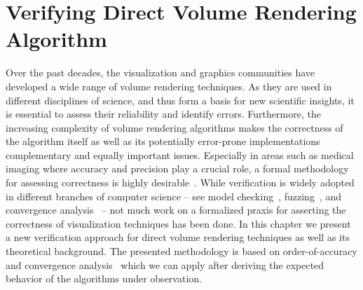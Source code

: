 \chapter{Verifying Direct Volume Rendering Algorithm}
\label{chap:vr}

Over the past decades, the visualization and graphics communities have developed a wide range of volume rendering techniques. As they are used in different disciplines of science, and thus form a basis for new scientific insights, it is essential to assess their reliability and identify errors. Furthermore, the increasing complexity of volume rendering algorithms makes the correctness of the algorithm itself as well as its potentially error-prone implementations complementary and equally important issues. Especially in areas such as medical imaging where accuracy and precision play a crucial role, a formal methodology for assessing correctness is highly desirable~\cite{kirby-vv-08, Pommert2002}. While verification is widely adopted in different branches of computer science -- see  model checking~\cite{Clarke08}, fuzzing~\cite{godefroid08}, and convergence analysis~\cite{Roy2005} -- not much work on a formalized praxis for asserting the correctness of visualization techniques has been done. 
In this chapter we present a new verification approach for direct volume rendering techniques as well as its theoretical background. 
The presented methodology is based on order-of-accuracy and convergence analysis~\cite{Roy2005} which we can apply after deriving the expected behavior of the algorithms under observation. 

